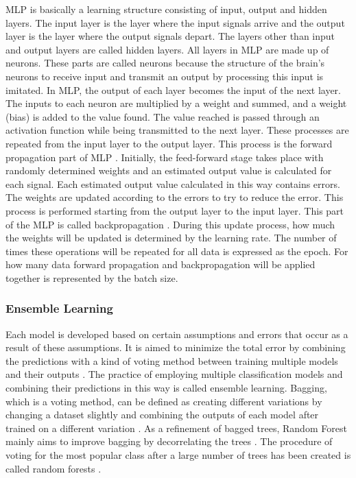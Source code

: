 MLP is basically a learning structure consisting of input, output and hidden layers. The input layer is the layer where the input signals arrive and the output layer is the layer where the output signals depart. The layers other than input and output layers are called hidden layers. All layers in MLP are made up of neurons. These parts are called neurons because the structure of the brain's neurons to receive input and transmit an output by processing this input is imitated. In MLP, the output of each layer becomes the input of the next layer. The inputs to each neuron are multiplied by a weight and summed, and a weight (bias) is added to the value found. The value reached is passed through an activation function while being transmitted to the next layer. These processes are repeated from the input layer to the output layer. This process is the forward propagation part of MLP \cite{haykin2010neural}. Initially, the feed-forward stage takes place with randomly determined weights and an estimated output value is calculated for each signal. Each estimated output value calculated in this way contains errors. The weights are updated according to the errors to try to reduce the error. This process is performed starting from the output layer to the input layer. This part of the MLP is called backpropagation \cite{haykin2010neural}. During this update process, how much the weights will be updated is determined by the learning rate. The number of times these operations will be repeated for all data is expressed as the epoch. For how many data forward propagation and backpropagation will be applied together is represented by the batch size.

\subsubsection{Ensemble Learning}
Each model is developed based on certain assumptions and errors that occur as a result of these assumptions. It is aimed to minimize the total error by combining the predictions with a kind of voting method between training multiple models and their outputs \cite{alpaydin2020introduction,sewell2011ensemble}. The practice of employing multiple classification models and combining their predictions in this way is called ensemble learning.
Bagging, which is a voting method, can be defined as creating different variations by changing a dataset slightly and combining the outputs of each model after trained on a different variation \cite{alpaydin2020introduction,sewell2011ensemble}. As a refinement of bagged trees, Random Forest mainly aims to improve bagging by decorrelating the trees \cite{breiman2001random}. The procedure of voting for the most popular class after a large number of trees has been created is called random forests \cite{breiman2001random}.

